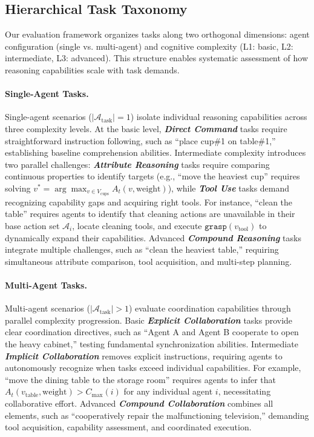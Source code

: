 \subsection{Hierarchical Task Taxonomy}

Our evaluation framework organizes tasks along two orthogonal dimensions: agent configuration (single vs. multi-agent) and cognitive complexity (L1: basic, L2: intermediate, L3: advanced). This structure enables systematic assessment of how reasoning capabilities scale with task demands.

\paragraph{Single-Agent Tasks.}
Single-agent scenarios ($|\mathcal{A}_{\text{task}}| = 1$) isolate individual reasoning capabilities across three complexity levels. At the basic level, \textbf{\textit{Direct Command}} tasks require straightforward instruction following, such as ``place cup\#1 on table\#1,'' establishing baseline comprehension abilities. Intermediate complexity introduces two parallel challenges: \textbf{\textit{Attribute Reasoning}} tasks require comparing continuous properties to identify targets (e.g., ``move the heaviest cup'' requires solving $v^* = \arg\max_{v \in V_{\text{cups}}} A_t(v, \text{weight})$), while \textbf{\textit{Tool Use}} tasks demand recognizing capability gaps and acquiring right tools. For instance, ``clean the table'' requires agents to identify that cleaning actions are unavailable in their base action set $\mathcal{A}_i$, locate cleaning tools, and execute $\texttt{grasp}(v_{\text{tool}})$ to dynamically expand their capabilities. Advanced \textbf{\textit{Compound Reasoning}} tasks integrate multiple challenges, such as ``clean the heaviest table,'' requiring simultaneous attribute comparison, tool acquisition, and multi-step planning.

\paragraph{Multi-Agent Tasks.}
Multi-agent scenarios ($|\mathcal{A}_{\text{task}}| > 1$) evaluate coordination capabilities through parallel complexity progression. Basic \textbf{\textit{Explicit Collaboration}} tasks provide clear coordination directives, such as ``Agent A and Agent B cooperate to open the heavy cabinet,'' testing fundamental synchronization abilities. Intermediate \textbf{\textit{Implicit Collaboration}} removes explicit instructions, requiring agents to autonomously recognize when tasks exceed individual capabilities. For example, ``move the dining table to the storage room'' requires agents to infer that $A_t(v_{\text{table}}, \text{weight}) > C_{\max}(i)$ for any individual agent $i$, necessitating collaborative effort. Advanced \textbf{\textit{Compound Collaboration}} combines all elements, such as ``cooperatively repair the malfunctioning television,'' demanding tool acquisition, capability assessment, and coordinated execution.

